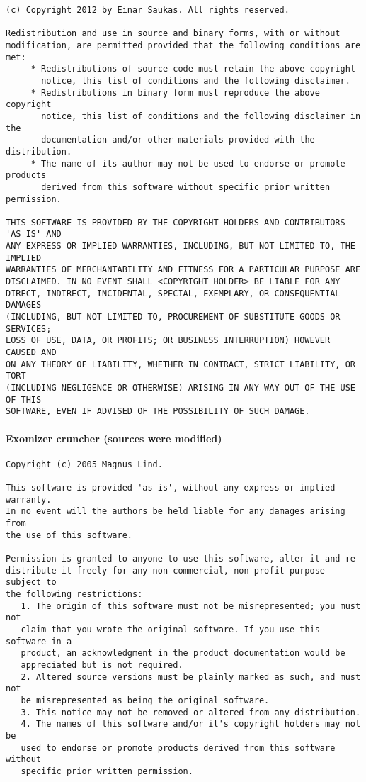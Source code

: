 \begin{verbatim}
(c) Copyright 2012 by Einar Saukas. All rights reserved.

Redistribution and use in source and binary forms, with or without
modification, are permitted provided that the following conditions are met:
     * Redistributions of source code must retain the above copyright
       notice, this list of conditions and the following disclaimer.
     * Redistributions in binary form must reproduce the above copyright
       notice, this list of conditions and the following disclaimer in the
       documentation and/or other materials provided with the distribution.
     * The name of its author may not be used to endorse or promote products
       derived from this software without specific prior written permission.

THIS SOFTWARE IS PROVIDED BY THE COPYRIGHT HOLDERS AND CONTRIBUTORS 'AS IS' AND
ANY EXPRESS OR IMPLIED WARRANTIES, INCLUDING, BUT NOT LIMITED TO, THE IMPLIED
WARRANTIES OF MERCHANTABILITY AND FITNESS FOR A PARTICULAR PURPOSE ARE
DISCLAIMED. IN NO EVENT SHALL <COPYRIGHT HOLDER> BE LIABLE FOR ANY
DIRECT, INDIRECT, INCIDENTAL, SPECIAL, EXEMPLARY, OR CONSEQUENTIAL DAMAGES
(INCLUDING, BUT NOT LIMITED TO, PROCUREMENT OF SUBSTITUTE GOODS OR SERVICES;
LOSS OF USE, DATA, OR PROFITS; OR BUSINESS INTERRUPTION) HOWEVER CAUSED AND
ON ANY THEORY OF LIABILITY, WHETHER IN CONTRACT, STRICT LIABILITY, OR TORT
(INCLUDING NEGLIGENCE OR OTHERWISE) ARISING IN ANY WAY OUT OF THE USE OF THIS
SOFTWARE, EVEN IF ADVISED OF THE POSSIBILITY OF SUCH DAMAGE.
\end{verbatim}


\paragraph{Exomizer cruncher (sources were modified)}

\begin{verbatim}
Copyright (c) 2005 Magnus Lind.

This software is provided 'as-is', without any express or implied warranty.
In no event will the authors be held liable for any damages arising from
the use of this software.

Permission is granted to anyone to use this software, alter it and re-
distribute it freely for any non-commercial, non-profit purpose subject to
the following restrictions:
   1. The origin of this software must not be misrepresented; you must not
   claim that you wrote the original software. If you use this software in a
   product, an acknowledgment in the product documentation would be
   appreciated but is not required.
   2. Altered source versions must be plainly marked as such, and must not
   be misrepresented as being the original software.
   3. This notice may not be removed or altered from any distribution.
   4. The names of this software and/or it's copyright holders may not be
   used to endorse or promote products derived from this software without
   specific prior written permission.
\end{verbatim}
